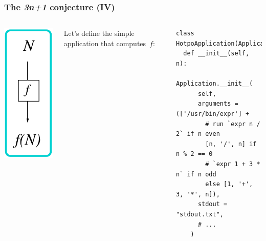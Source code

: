 \documentclass[english,serif,mathserif,xcolor=pdftex,dvipsnames,table]{beamer}
\begin{document}
\begin{frame}[fragile]
  \frametitle{The \emph{3n+1} conjecture (IV)}
  \label{sec:10}

  \begin{columns}
    \begin{center}
      \includegraphics[height=0.8\textheight]{fig/A}
    \end{center}

    Let's define the simple application that computes~$f$:
    \begin{lstlisting}
class HotpoApplication(Application):
  def __init__(self, n):
    Application.__init__(
      self,
      arguments = (['/usr/bin/expr'] +
        # run `expr n / 2` if n even
        [n, '/', n] if n % 2 == 0
        # `expr 1 + 3 * n` if n odd
        else [1, '+', 3, '*', n]),
      stdout = "stdout.txt",
      # ...
    )
    \end{lstlisting}
  \end{columns}
\end{frame}
\end{document}
